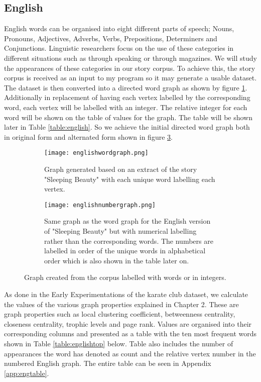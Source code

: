 \subsection{English}
English words can be organised into eight different parts of speech; Nouns, Pronouns, Adjectives, Adverbs, Verbs, Prepositions, Determiners and Conjunctions. Linguistic researchers focus on the use of these categories in different situations such as through speaking or through magazines\cite{khaisaeng2017study}. We will study the appearances of these categories in our story corpus. To achieve this, the story corpus is received as an input to my program so it may generate a usable dataset. The dataset is then converted into a directed word graph as shown by figure \ref{fig:engword}. Additionally in replacement of having each vertex labelled by the corresponding word, each vertex will be labelled with an integer. The relative integer for each word will be shown on the table of values for the graph. The table will be shown later in Table \ref{table:english}. So we achieve the initial directed word graph both in original form and alternated form shown in figure \ref{fig:engnum}.

\begin{figure}[H]
\centering
\begin{subfigure}{.45\textwidth}
	\texttt{[image: englishwordgraph.png]}
	\caption{Graph generated based on an extract of the story "Sleeping Beauty" with each unique word labelling each vertex.}
	\label{fig:engword}
\end{subfigure}
\hfill
\begin{subfigure}{.45\textwidth}
	\texttt{[image: englishnumbergraph.png]}
	\caption{Same graph as the word graph for the English version of "Sleeping Beauty" but with numerical labelling rather than the corresponding words. The numbers are labelled in order of the unique words in alphabetical order which is also shown in the table later on.}
	\label{fig:engnum}
\end{subfigure}
\caption{Graph created from the corpus labelled with words or in integers.}
\end{figure}

As done in the Early Experimentations of the karate club dataset, we calculate the values of the various graph properties explained in Chapter 2. These are graph properties such as local clustering coefficient, betweenness centrality, closeness centrality, trophic levels and page rank. Values are organised into their corresponding columns and presented as a table with the ten most frequent words shown in Table \ref{table:englishtop} below. Table also includes the number of appearances the word has denoted as count and the relative vertex number in the numbered English graph. The entire table can be seen in Appendix \ref{app:engtable}.

